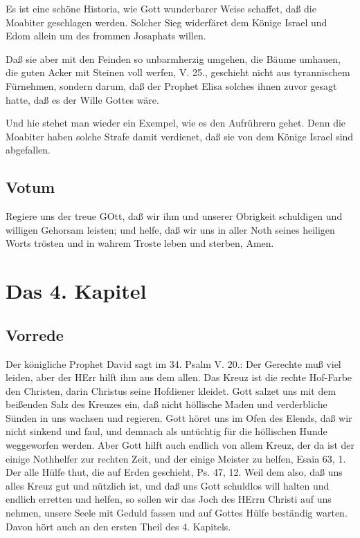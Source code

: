Es ist eine schöne Historia, wie Gott wunderbarer Weise schaffet, daß die Moabiter geschlagen werden. Solcher Sieg widerfäret dem Könige Israel und Edom allein um des frommen Josaphats willen.

Daß sie aber mit den Feinden so unbarmherzig umgehen, die Bäume umhauen, die guten Acker mit Steinen voll werfen, V. 25., geschieht nicht aus tyrannischem Fürnehmen, sondern darum, daß der Prophet Elisa solches ihnen zuvor gesagt hatte, daß es der Wille Gottes wäre.

Und hie stehet man wieder ein Exempel, wie es den Aufrührern gehet. Denn die Moabiter haben solche Strafe damit verdienet, daß sie von dem Könige Israel sind abgefallen.

\section{Votum}

Regiere uns der treue GOtt, daß wir ihm und unserer Obrigkeit schuldigen und willigen Gehorsam leisten; und helfe, daß wir uns in aller Noth seines heiligen Worts trösten und in wahrem Troste leben und sterben, Amen.

\chapter{Das 4. Kapitel}

\section{Vorrede}

Der königliche Prophet David sagt im 34. Psalm V. 20.: Der Gerechte muß viel leiden, aber der HErr hilft ihm aus dem allen. Das Kreuz ist die rechte Hof-Farbe den Christen, darin Christus seine Hofdiener kleidet. Gott salzet uns mit dem beißenden Salz des Kreuzes ein, daß nicht höllische Maden und verderbliche Sünden in uns wachsen und regieren. Gott höret uns im Ofen des Elends, daß wir nicht sinkend und faul, und demnach als untüchtig für die höllischen Hunde weggeworfen werden. Aber Gott hilft auch endlich von allem Kreuz, der da ist der einige Nothhelfer zur rechten Zeit, und der einige Meister zu helfen, Esaia 63, 1. Der alle Hülfe thut, die auf Erden geschieht, Ps. 47, 12. Weil dem also, daß uns alles Kreuz gut und nützlich ist, und daß uns Gott schuldlos will halten und endlich erretten und helfen, so sollen wir das Joch des HErrn Christi auf uns nehmen, unsere Seele mit Geduld fassen und auf Gottes Hülfe beständig warten. Davon hört auch an den ersten Theil des 4. Kapitels.

